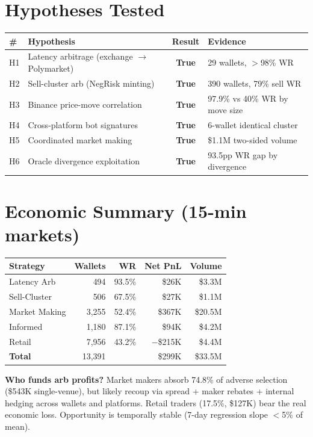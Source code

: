 \documentclass[11pt,a4paper]{article}
\begin{document}
\section*{Hypotheses Tested}

\begin{tabular}{@{}llcl@{}}
\toprule
\textbf{\#} & \textbf{Hypothesis} & \textbf{Result} & \textbf{Evidence} \\
\midrule
H1 & Latency arbitrage (exchange $\to$ Polymarket) & \textbf{True} & 29 wallets, $>$98\% WR \\
H2 & Sell-cluster arb (NegRisk minting) & \textbf{True} & 390 wallets, 79\% sell WR \\
H3 & Binance price-move correlation & \textbf{True} & 97.9\% vs 40\% WR by move size \\
H4 & Cross-platform bot signatures & \textbf{True} & 6-wallet identical cluster \\
H5 & Coordinated market making & \textbf{True} & \$1.1M two-sided volume \\
H6 & Oracle divergence exploitation & \textbf{True} & 93.5pp WR gap by divergence \\
\bottomrule
\end{tabular}

\section*{Economic Summary (15-min markets)}

\begin{tabular}{@{}lrrrr@{}}
\toprule
\textbf{Strategy} & \textbf{Wallets} & \textbf{WR} & \textbf{Net PnL} & \textbf{Volume} \\
\midrule
Latency Arb & 494 & 93.5\% & \$26K & \$3.3M \\
Sell-Cluster & 506 & 67.5\% & \$27K & \$1.1M \\
Market Making & 3,255 & 52.4\% & \$367K & \$20.5M \\
Informed & 1,180 & 87.1\% & \$94K & \$4.2M \\
Retail & 7,956 & 43.2\% & $-$\$215K & \$4.4M \\
\midrule
\textbf{Total} & 13,391 &  & \$299K & \$33.5M \\
\bottomrule
\end{tabular}

\medskip
\noindent\textbf{Who funds arb profits?} Market makers absorb 74.8\% of adverse selection (\$543K single-venue), but likely recoup via spread + maker rebates + internal hedging across wallets and platforms. Retail traders (17.5\%, \$127K) bear the real economic loss. Opportunity is temporally stable (7-day regression slope $<$5\% of mean).
\end{document}
